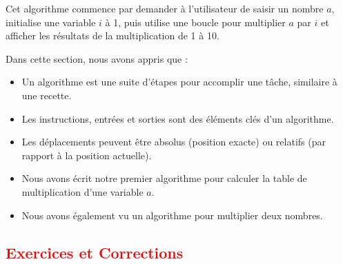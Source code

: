 \documentclass{article}
\begin{document}
Cet algorithme commence par demander à l'utilisateur de saisir un nombre \( a \), initialise une variable \( i \) à 1, puis utilise une boucle pour multiplier \( a \) par \( i \) et afficher les résultats de la multiplication de 1 à 10.


\begin{tcolorbox}[colback=cyan!10!white, colframe=cyan!75!black, title=\textcolor{white}{Récapitulatif}]
Dans cette section, nous avons appris que :
\begin{itemize}
    \item Un algorithme est une suite d'étapes pour accomplir une tâche, similaire à une recette.
    \item Les instructions, entrées et sorties sont des éléments clés d'un algorithme.
    \item Les déplacements peuvent être absolus (position exacte) ou relatifs (par rapport à la position actuelle).
    \item Nous avons écrit notre premier algorithme pour calculer la table de multiplication d'une variable \( a \).
    \item Nous avons également vu un algorithme pour multiplier deux nombres.
\end{itemize}
\end{tcolorbox}

\subsection{\textcolor{red}{Exercices et Corrections}}
\end{document}
